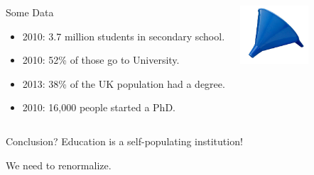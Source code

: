 \documentclass[10pt,handout]{beamer}
\begin{document}
\begin{frame}

\begin{columns}[c]
\begin{block}{Some Data}
\begin{itemize}
\item 2010: 3.7 million students in secondary school. %
\item 2010: 52\% of those go to University. %
\item 2013: 38\% of the UK population had a degree. %
\item 2010: 16,000 people started a PhD. %
\end{itemize}
\end{block}
\begin{center}
\includegraphics[width=1in]{Funnel.jpg}
\end{center}
\end{columns}

\begin{block}{Conclusion?}
Education is a self-populating institution!
\vspace{1em}
\begin{center}
\end{center}
\vspace{1em}
We need to renormalize.

\end{block}

\end{frame}

\end{document}
